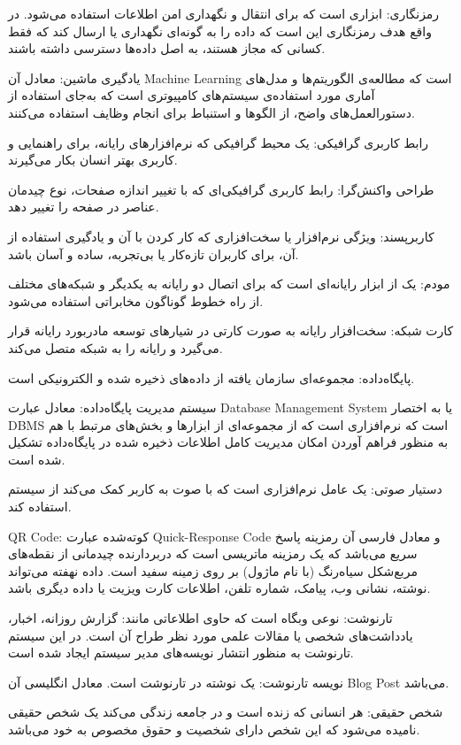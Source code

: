 \documentclass[12pt]{article}
\begin{document}
		رمزنگاری: ابزاری است که برای انتقال و نگهداری امن اطلاعات استفاده می‌شود. در واقع هدف رمزنگاری این است که داده را به گونه‌ای نگهداری یا ارسال کند که فقط کسانی که مجاز هستند، به اصل داده‌ها دسترسی داشته باشند.

		یادگیری ماشین: معادل آن Machine Learning است که مطالعه‌ی الگوریتم‌ها و مدل‌های آماری مورد استفاده‌ی سیستم‌های کامپیوتری است که به‌جای استفاده از دستورالعمل‌های واضح، از الگوها و استنباط برای انجام وظایف استفاده می‌کنند.

		رابط کاربری گرافیکی: یک محیط گرافیکی که نرم‌افزارهای رایانه، برای راهنمایی و کاربری بهتر انسان بکار می‌گیرند.

		طراحی واکنش‌گرا:‌ رابط کاربری گرافیکی‌ای که با تغییر اندازه صفحات، نوع چیدمان عناصر در صفحه را تغییر دهد.

		کاربر‌پسند: ویژگی نرم‌‏افزار یا سخت‏‌افزاری که کار کردن با آن و یادگیری استفاده از آن، برای کاربران تازه‏‌کار یا بی‌‏تجربه، ساده و آسان باشد.

		مودم: یک از ابزار رایانه‌ای است که برای اتصال دو رایانه به یکدیگر و شبکه‌های مختلف از راه خطوط گوناگون مخابراتی استفاده می‌شود.

		کارت شبکه:‌ سخت‌افزار رایانه به صورت کارتی در شیارهای توسعه مادربورد رایانه قرار می‌گیرد و رایانه را به شبکه متصل می‌کند.

		پایگاه‌داده: مجموعه‌ای سازمان یافته از داده‌های ذخیره شده و الکترونیکی است.

		سیستم مدیریت پایگاه‌داده: معادل عبارت Database Management System  یا به اختصار DBMS است که نرم‌افزاری است که از مجموعه‌ای از ابزارها و بخش‌های مرتبط با هم به منظور فراهم آوردن امکان مدیریت کامل اطلاعات ذخیره شده در پایگاه‌داده تشکیل شده است.

		دستیار صوتی: یک عامل نرم‌افزاری است که با صوت به کاربر کمک می‌کند از سیستم استفاده کند.

		QR Code: کوته‌شده عبارت Quick-Response Code و معادل فارسی آن رمزینه پاسخ سریع می‌باشد که یک رمزینه ماتریسی است که دربردارنده چیدمانی از نقطه‌های مربع‌شکل سیاه‌رنگ (با نام ماژول) بر روی زمینه سفید است. داده نهفته می‌تواند نوشته، نشانی وب، پیامک، شماره تلفن، اطلاعات کارت ویزیت یا داده دیگری باشد.

		تارنوشت:  نوعی وبگاه است که حاوی اطلاعاتی مانند: گزارش روزانه، اخبار، یادداشت‌های شخصی یا مقالات علمی مورد نظر طراح آن است. در این سیستم تارنوشت به منظور انتشار نویسه‌های مدیر سیستم ایجاد شده است.

		نویسه‌ تارنوشت: یک نوشته در تارنوشت است. معادل انگلیسی آن Blog Post می‌باشد.

		شخص حقیقی: هر انسانی که زنده است و در جامعه زندگی می‌کند یک شخص حقیقی نامیده می‌شود که این شخص دارای شخصیت و حقوق مخصوص به خود می‌باشد.
\end{document}
